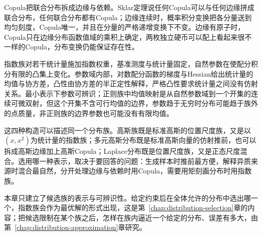Copula把联合分布拆成边缘与依赖。Sklar定理说任何Copula可以与任何边缘拼成联合分布，任何联合分布都有Copula；边缘连续时，概率积分变换把各分量送到均匀刻度，Copula唯一，并且在分量的严格递增变换下不变。边缘有原子时，Copula只在边缘分布函数值域的乘积上确定，两枚独立硬币可以配上看起来很不一样的Copula，分布变换仍能保证存在性。

指数族对若干统计量施加指数权重，基准测度与统计量固定，自然参数在使配分积分有限的凸集上变化。参数域内部，对数配分函数的梯度与Hessian给出统计量的均值与协方差，凸性由协方差的半正定性解释，严格凸性要求统计量之间没有仿射关系。最小表示下参数可辨识；正则族中均值映射是从自然参数域到一个开集的连续可微双射，但这个开集不含可行均值的边界，参数趋于无穷时分布可能趋于族外的点质量，非正则族的边界参数也可能没有有限均值。

这四种构造可以描述同一个分布族。高斯族既是标准高斯的位置尺度族，又是以$(x,x^{2})$为统计量的指数族；多元高斯分布既是标准高斯向量的仿射推前，也可以拆成高斯边缘加上高斯Copula；Laplace分布既是位置尺度族，又是正态尺度混合。选用哪一种表示，取决于要回答的问题：生成样本时推前最方便，解释异质来源时混合最自然，分开处理边缘与依赖时用Copula，需要用矩刻画分布时用指数族。

本章只建立了候选族的表示与可辨识性。给定约束后在全体允许的分布中选出哪一个，指数族会作为最优解的形式出现，这是第~\ref{chap:distribution-selection}章的内容；把候选限制在某个族之后，怎样在族内逼近一个给定的分布、误差有多大，由第~\ref{chap:distribution-approximation}章研究。
